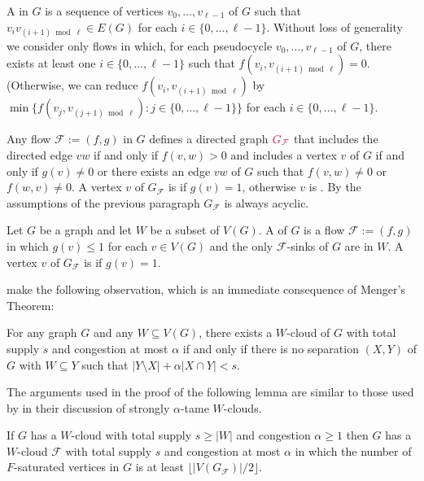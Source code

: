\documentclass{patmorin}
\begin{document}
A  in $G$ is a sequence of vertices $v_0,\ldots,v_{\ell-1}$ of $G$ such that $v_iv_{(i+1)\bmod\ell}\in E(G)$ for each $i\in\{0,\ldots,\ell-1\}$.
Without loss of generality we consider only flows in which, for each pseudocycle $v_0,\ldots,v_{\ell-1}$ of $G$, there exists at least one $i\in\{0,\ldots,\ell-1\}$ such that $f(v_i,v_{(i+1)\bmod\ell})=0$.  (Otherwise, we can reduce $f(v_i,v_{(i+1)\bmod \ell})$ by $\min\{f(v_j,v_{(j+1)\bmod\ell}):j\in\{0,\ldots,\ell-1\}\}$ for each $i\in\{0,\ldots,\ell-1\}$.

Any flow $\mathcal{F}:=(f,g)$ in $G$ defines a directed graph $\mathdefin{G_{\mathcal{F}}}$ that includes the directed edge $vw$ if and only if $f(v,w)>0$ and includes a vertex $v$ of $G$ if and only if $g(v)\neq 0$ or there exists an edge $vw$ of $G$ such that $f(v,w)\neq 0$ or $f(w,v)\neq 0$.  A vertex $v$ of $G_\mathcal{F}$ is  if $g(v)=1$, otherwise $v$ is .  By the assumptions of the previous paragraph $G_{\mathcal{F}}$ is always acyclic.

Let $G$ be a graph and let $W$ be a subset of $V(G)$.  A  of $G$ is a flow $\mathcal{F}:=(f,g)$ in which $g(v)\le 1$ for each $v\in V(G)$ and the only $\mathcal{F}$-sinks of $G$ are in $W$.  A vertex $v$ of $G_{\mathcal{F}}$ is  if $g(v)=1$.


\citet{dvorak.norin:treewidth} make the following observation, which is an immediate consequence of Menger's Theorem:

\begin{obs}\label{flow_vs_cut}
  For any graph $G$ and any $W\subseteq V(G)$, there exists a $W$-cloud of $G$ with total supply $s$ and congestion at most $\alpha$ if and only if there is no separation $(X,Y)$ of $G$ with $W\subseteq Y$ such that $|Y\setminus X| + \alpha|X\cap Y| < s$.
\end{obs}

The arguments used in the proof of the following lemma are similar to those used by \citet{dvorak.norin:treewidth} in their discussion of strongly $\alpha$-tame $W$-clouds.

\begin{lem}
  If $G$ has a $W$-cloud with total supply $s\ge |W|$ and congestion $\alpha\ge 1$ then $G$ has a $W$-cloud $\mathcal{F}$ with total supply $s$ and congestion at most $\alpha$ in which the number of $F$-saturated vertices in $G$ is at least $\lfloor|V(G_{\mathcal{F}})|/2\rfloor$.
\end{lem}
\end{document}
